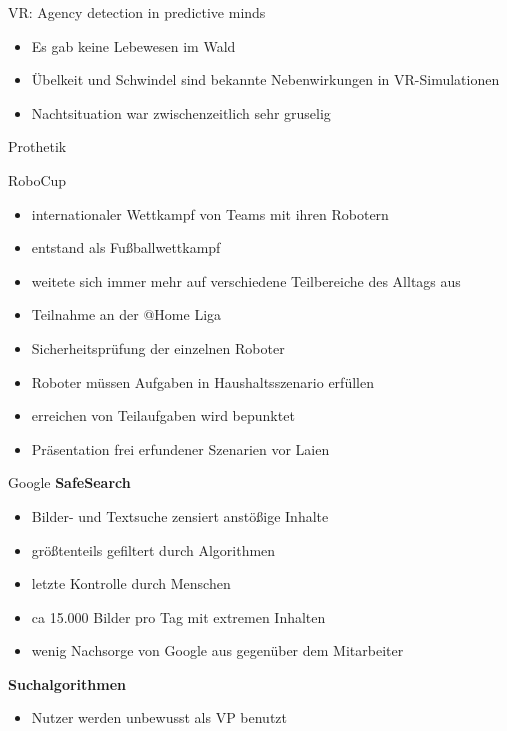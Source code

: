 \documentclass[10pt]{beamer}
\begin{document}
	
	\begin{frame}{VR: Agency detection in predictive minds}
		
		\begin{itemize}
			\item Es gab keine Lebewesen im Wald
			\item Übelkeit und Schwindel sind bekannte Nebenwirkungen in VR-Simulationen
			\item Nachtsituation war zwischenzeitlich sehr gruselig
		\end{itemize}
		
	\end{frame}

	\begin{frame}{Prothetik}
	
	\end{frame}
		
		\begin{frame}{RoboCup}
			\begin{itemize}
				\item internationaler Wettkampf von Teams mit ihren Robotern
				\item entstand als Fußballwettkampf
				\item weitete sich immer mehr auf verschiedene Teilbereiche des Alltags aus
				\item Teilnahme an der @Home Liga
				\item Sicherheitsprüfung der einzelnen Roboter
				\item Roboter müssen Aufgaben in Haushaltsszenario erfüllen
				\item erreichen von Teilaufgaben wird bepunktet
				\item Präsentation frei erfundener Szenarien vor Laien 
			\end{itemize}
		\end{frame}
		
			\begin{frame}{Google}
				\textbf{SafeSearch}
				\begin{itemize}
					\item Bilder- und Textsuche zensiert anstößige Inhalte
					\item größtenteils gefiltert durch Algorithmen
					\item letzte Kontrolle durch Menschen
					\item ca 15.000 Bilder pro Tag mit extremen Inhalten
					\item wenig Nachsorge von Google aus gegenüber dem Mitarbeiter
				\end{itemize}
				\textbf{Suchalgorithmen}
				\begin{itemize}
					\item Nutzer werden unbewusst als VP benutzt
				\end{itemize}
			\end{frame}
	
\end{document}
